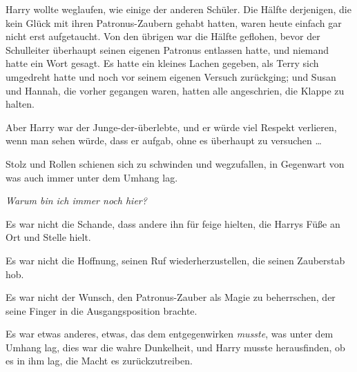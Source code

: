 Harry wollte weglaufen, wie einige der anderen Schüler. Die Hälfte derjenigen, die kein Glück mit ihren Patronus-Zaubern gehabt hatten, waren heute einfach gar nicht erst aufgetaucht. Von den übrigen war die Hälfte geflohen, bevor der Schulleiter überhaupt seinen eigenen Patronus entlassen hatte, und niemand hatte ein Wort gesagt. Es hatte ein kleines Lachen gegeben, als Terry sich umgedreht hatte und noch vor seinem eigenen Versuch zurückging; und Susan und Hannah, die vorher gegangen waren, hatten alle angeschrien, die Klappe zu halten.

Aber Harry war der Junge-der-überlebte, und er würde viel Respekt verlieren, wenn man sehen würde, dass er aufgab, ohne es überhaupt zu versuchen …

Stolz und Rollen schienen sich zu schwinden und wegzufallen, in Gegenwart von was auch immer unter dem Umhang lag.

\emph{Warum bin ich immer noch hier?}

Es war nicht die Schande, dass andere ihn für feige hielten, die Harrys Füße an Ort und Stelle hielt.

Es war nicht die Hoffnung, seinen Ruf wiederherzustellen, die seinen Zauberstab hob.

Es war nicht der Wunsch, den Patronus-Zauber als Magie zu beherrschen, der seine Finger in die Ausgangsposition brachte.

Es war etwas anderes, etwas, das dem entgegenwirken \emph{musste}, was unter dem Umhang lag, dies war die wahre Dunkelheit, und Harry musste herausfinden, ob es in ihm lag, die Macht es zurückzutreiben.

